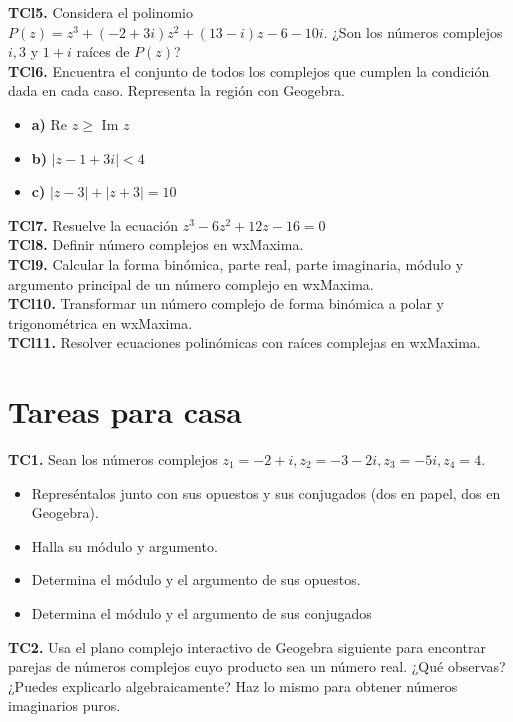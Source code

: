 \documentclass[../main.tex]{memoir}
\begin{document}
\textbf{TCl5.} Considera el polinomio $P(z) = z^3+(-2+3i)z^2 +(13-i)z-6-10i$. ¿Son los números complejos $i, 3$ y $1+i$ raíces de $P(z)$? \\

\textbf{TCl6.} Encuentra el conjunto de todos los complejos que cumplen la condición dada en cada caso. Representa la región con Geogebra.


\begin{itemize}
	\item \textbf{a)} Re $z \geq$ Im $z$
	\item \textbf{b)} $|z-1+3i| < 4$
	\item \textbf{c)} $|z-3| + |z+3| = 10$
\end{itemize}

\textbf{TCl7.} Resuelve la ecuación $z^3-6z^2+12z-16=0$ \\


\textbf{TCl8.} Definir número complejos en wxMaxima. \\

\textbf{TCl9.} Calcular la forma binómica, parte real, parte imaginaria, módulo y argumento principal de un número complejo en wxMaxima. \\

\textbf{TCl10.} Transformar un número complejo de forma binómica a polar y trigonométrica en wxMaxima. \\

\textbf{TCl11.} Resolver ecuaciones polinómicas con raíces complejas en wxMaxima. \\


\section{Tareas para casa}
\textbf{TC1.}  Sean los números complejos $z_1 = -2+i, z_2=-3-2i, z_3 = -5i, z_4 = 4$.
\begin{itemize}
	\item Represéntalos junto con sus opuestos y sus conjugados (dos en papel, dos en Geogebra).
	\item Halla su módulo y argumento.
	\item Determina el módulo y el argumento de sus opuestos.
	\item Determina el módulo y el argumento de sus conjugados
\end{itemize}

\textbf{TC2.} Usa el plano complejo interactivo de Geogebra siguiente para encontrar parejas de números complejos cuyo producto sea un número real. ¿Qué observas? ¿Puedes explicarlo algebraicamente? Haz lo mismo para obtener números imaginarios puros. \\
\end{document}

